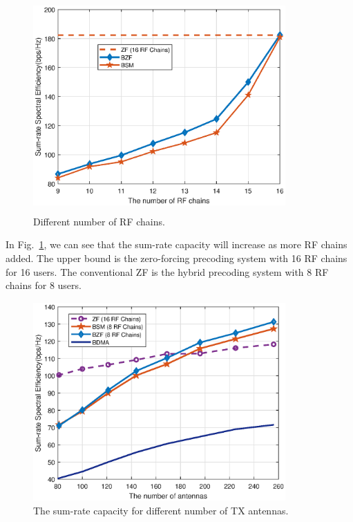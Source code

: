 \documentclass[conference]{IEEEtran}
\begin{document}
{\begin{figure}[ht]
	\begin{center}
		\includegraphics[width=3.8in,height=3.2in]{Figure/differentRF1path.eps}
		\caption{Different number of RF chains.}\label{fig:RFchains}
	\end{center}
\end{figure}
In Fig.~\ref{fig:RFchains}, we can see that the sum-rate capacity will increase as more RF chains added. The upper bound is the zero-forcing precoding system with 16 RF chains for 16 users. The conventional ZF is the hybrid precoding system with 8 RF chains for 8 users.


\begin{figure}[ht]
	\begin{center}
		\includegraphics[width=3.8in,height=3in]{Figure/antenna1path.eps}
		\caption{The sum-rate capacity for different number of TX antennas.}\label{fig:CDF}
	\end{center}
\end{figure}

}
\end{document}
